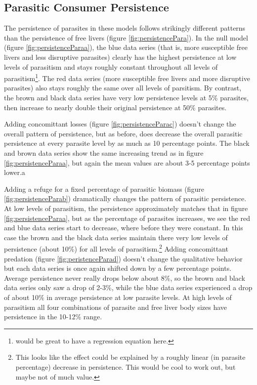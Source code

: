 \documentclass[11pt]{amsart}
\begin{document}
\subsection{Parasitic Consumer Persistence \label{sec:persistencePara}}

The persistence of parasites in these models follows strikingly different patterns than the persistence of free livers (figure \ref{fig:persistencePara}).  In the null model (figure \ref{fig:persistenceParaa}), the blue data series (that is, more susceptible free livers and less disruptive parasites) clearly has the highest persistence at low levels of parasitism and stays roughly constant throughout all levels of parasitism\footnote{would be great to have a regression equation here.}.  The red data series (more susceptible free livers and more disruptive parasites) also stays roughly the same over all levels of parsitism.   By contrast, the brown and black data series have very low persistence levels at 5\% parasites, then increase to nearly double their original persistence at 50\% parasites.

Adding concomittant losses (figure \ref{fig:persistenceParac}) doesn't change the overall pattern of persistence, but as before, does decrease the overall parasitic persistence at every parasite level by as much as 10 percentage points.  The black and brown data series show the same increasing trend as in figure \ref{fig:persistenceParaa}, but again the mean values are about 3-5 percentage points lower.a

Adding a refuge for a fixed percentage of parasitic biomass (figure \ref{fig:persistenceParab}) dramatically changes the pattern of parasitic persistence.  At low levels of parasitism, the persistence approximately matches that in figure \ref{fig:persistenceParaa}, but as the percentage of parasites increases, we see the red and blue data series start to decrease, where before they were constant.  In this case the brown and the black data series maintain there very low levels of persistence (about 10\%) for all levels of parasitism.\footnote{This looks like the effect could be explained by a roughly linear (in parasite percentage) decrease in persistence.  This would be cool to work out, but maybe not of much value.}
  Adding concomittant predation (figure \ref{fig:peristenceParad}) doesn't change the qualitative behavior but each data series is once again shifted down by a few percentage points.  Average persistence never really drops below about 8\%, so the brown and black data series only saw a drop of 2-3\%, while the blue data series experienced a drop of about 10\% in average persistence at low parasite levels.  At high levels of parasitism all four combinations of parasite and free liver body sizes have persistence in the 10-12\% range.
\end{document}
